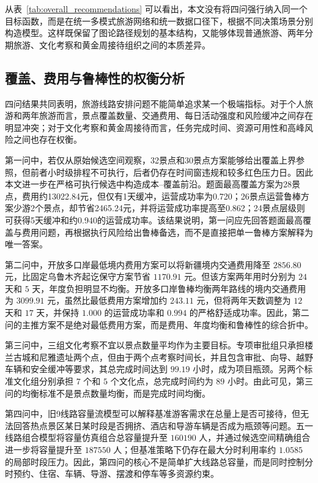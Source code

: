 \documentclass[UTF8,zihao=-4,a4paper]{ctexart}
\begin{document}
从表~\ref{tab:overall_recommendations} 可以看出，本文没有将四问强行纳入同一个目标函数，而是在统一多模式旅游网络和统一数据口径下，根据不同决策场景分别构造模型。这样既保留了图论路径规划的基本结构，又能够体现普通旅游、两年分期旅游、文化考察和黄金周接待组织之间的本质差异。

\subsection{覆盖、费用与鲁棒性的权衡分析}
\label{subsec:tradeoff_analysis}

四问结果共同表明，旅游线路安排问题不能简单追求某一个极端指标。对于个人旅游和两年旅游而言，景点覆盖数量、交通费用、每日活动强度和风险缓冲之间存在明显冲突；对于文化考察和黄金周接待而言，任务完成时间、资源可用性和高峰风险之间也存在权衡。

第一问中，若仅从原始候选空间观察，32景点和30景点方案能够给出覆盖上界参照，但前者小时级排程不可执行，后者仍存在时间窗违规和较多红色压力日。因此本文进一步在严格可执行候选中构造成本--覆盖前沿。题面最高覆盖方案为28景点，费用约13022.84元，但仅有1天缓冲，运营成功率为0.720；26景点运营鲁棒方案少游2个景点，却节省2465.24元，并将运营成功率提高至0.862；24景点层级则可获得5天缓冲和约0.940的运营成功率。该结果说明，第一问应先回答题面最高覆盖与费用问题，再根据执行风险给出鲁棒备选，而不是直接把单一鲁棒方案解释为唯一答案。

第二问中，开放多口岸最低境内费用方案可以将新疆境内交通费用降至 $2856.80$ 元，比固定乌鲁木齐起讫保守方案节省 $1170.91$ 元。但该方案两年用时分别为 $24$ 天和 $5$ 天，年度负担明显不均衡。开放多口岸鲁棒均衡两年路线的境内交通费用为 $3099.91$ 元，虽然比最低费用方案增加约 $243.11$ 元，但将两年天数调整为 $12$ 天和 $17$ 天，并保持 $1.000$ 的运营成功率和 $0.994$ 的严格舒适成功率。因此，第二问的主推方案不是绝对最低费用方案，而是费用、年度均衡和鲁棒性的综合折中。

第三问中，三组文化考察不宜以景点数量平均作为主要目标。专项审批组只承担楼兰古城和尼雅遗址两个点，但由于两个点考察时间长，并且包含审批、向导、越野车辆和安全缓冲等要求，其总完成时间达到 $99.19$ 小时，成为项目瓶颈。另两个标准文化组分别承担 $7$ 个和 $5$ 个文化点，总完成时间约为 $89$ 小时。由此可见，第三问的均衡标准不是景点数量均衡，而是完成时间均衡。

第四问中，旧9线路容量流模型可以解释基准游客需求在总量上是否可接待，但无法回答热点景区某日某时段是否拥挤、酒店和导游车辆是否成为瓶颈等问题。五一线路组合模型将容量仿真组合总容量提升至 $160190$ 人，并通过候选空间精确组合进一步将容量提升至 $187550$ 人；但基准策略下仍存在最大分时利用率约 $1.0585$ 的局部时段压力。因此，第四问的核心不是简单扩大线路总容量，而是同时控制分时预约、住宿、车辆、导游、摆渡和停车等多资源约束。
\end{document}
